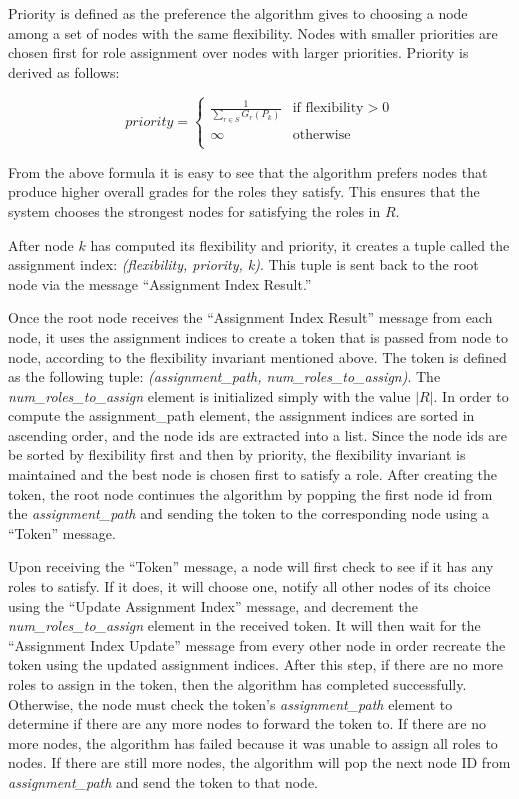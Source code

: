 \documentclass[11pt]{article}
\begin{document}
\begin{multicols}{2}
Priority is defined as the preference the algorithm gives to choosing a node among a set of nodes with the same flexibility. Nodes with smaller priorities are chosen first for role assignment over nodes with larger priorities. Priority is derived as follows:

\begin{equation*}
     priority = \begin{cases}
               \frac{1}{\sum_{r \in S }G_{r}(P_{k}) }               & \text{if flexibility} > 0\\
               \infty               & \text{otherwise}\\
           \end{cases}
\end{equation*}

From the above formula it is easy to see that the algorithm prefers nodes that produce higher overall grades for the roles they satisfy. This ensures that the system chooses the strongest nodes for satisfying the roles in $R$.

After node $k$ has computed its flexibility and priority, it creates a tuple called the assignment index: \textit{(flexibility, priority, k)}. This tuple is sent back to the root node via the message ``Assignment Index Result.''

Once the root node receives the ``Assignment Index Result'' message from each node, it uses the assignment indices to create a token that is passed from node to node, according to the flexibility invariant mentioned above. The token is defined as the following tuple: \textit{(assignment\_path, num\_roles\_to\_assign)}. The \textit{num\_roles\_to\_assign} element is initialized simply with the value $|R|$. In order to compute the assignment\_path element, the assignment indices are sorted in ascending order, and the node ids are extracted into a list. Since the node ids are be sorted by flexibility first and then by priority, the flexibility invariant is maintained and the best node is chosen first to satisfy a role. After creating the token, the root node continues the algorithm by popping the first node id from the \textit{assignment\_path} and sending the token to the corresponding node using a ``Token'' message.

Upon receiving the ``Token'' message, a node will first check to see if it has any roles to satisfy. If it does, it will choose one, notify all other nodes of its choice using the ``Update Assignment Index'' message, and decrement the \textit{num\_roles\_to\_assign} element in the received token. It will then wait for the ``Assignment Index Update'' message from every other node in order recreate the token using the updated assignment indices. After this step, if there are no more roles to assign in the token, then the algorithm has completed successfully. Otherwise, the node must check the token's \textit{assignment\_path} element to determine if there are any more nodes to forward the token to. If there are no more nodes, the algorithm has failed because it was unable to assign all roles to nodes. If there are still more nodes, the algorithm will pop the next node ID from \textit{assignment\_path} and send the token to that node.


\end{multicols}
\end{document}
